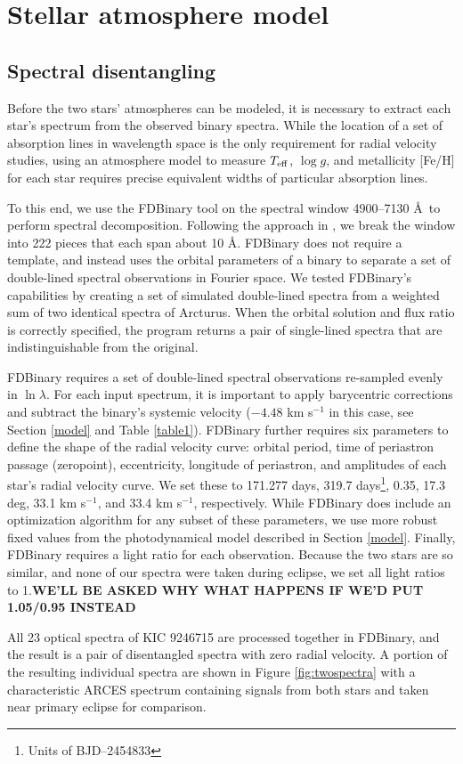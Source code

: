 \section{Stellar atmosphere model}\label{atm}

\subsection{Spectral disentangling}\label{disentangle}
Before the two stars' atmospheres can be modeled, it is necessary to extract each star's spectrum from the observed binary spectra. While the location of a set of absorption lines in wavelength space is the only requirement for radial velocity studies, using an atmosphere model to measure $T_{\rm{eff}}$, $\log g$, and metallicity [Fe/H] for each star requires precise equivalent widths of particular absorption lines.

To this end, we use the FDBinary tool \citep{ili04} on the spectral window 4900--7130 \AA \ to perform spectral decomposition. Following the approach in \citet{bec14}, we break the window into 222 pieces that each span about 10 \AA. FDBinary does not require a template, and instead uses the orbital parameters of a binary to separate a set of double-lined spectral observations in Fourier space. We tested FDBinary's capabilities by creating a set of simulated double-lined spectra from a weighted sum of two identical spectra of Arcturus. When the orbital solution and flux ratio is correctly specified, the program returns a pair of single-lined spectra that are indistinguishable from the original.

FDBinary requires a set of double-lined spectral observations re-sampled evenly in $\ln \lambda$. For each input spectrum, it is important to apply barycentric corrections and subtract the binary's systemic velocity ($-4.48$ km s$^{-1}$ in this case, see Section \ref{model} and Table \ref{table1}). FDBinary further requires six parameters to define the shape of the radial velocity curve: orbital period, time of periastron passage (zeropoint), eccentricity, longitude of periastron, and amplitudes of each star's radial velocity curve. We set these to 171.277 days, 319.7 days\footnote{Units of BJD--2454833}, 0.35, 17.3 deg, 33.1 km s$^{-1}$, and 33.4 km s$^{-1}$, respectively. While FDBinary does include an optimization algorithm for any subset of these parameters, we use more robust fixed values from the photodynamical model described in Section \ref{model}. Finally, FDBinary requires a light ratio for each observation. Because the two stars are so similar, and none of our spectra were taken during eclipse, we set all light ratios to 1.{\bf{WE'LL BE ASKED WHY WHAT HAPPENS IF WE'D PUT 1.05/0.95 INSTEAD}}

All 23 optical spectra of KIC 9246715 are processed together in FDBinary, and the result is a pair of disentangled spectra with zero radial velocity. A portion of the resulting individual spectra are shown in Figure \ref{fig:twospectra} with a characteristic ARCES spectrum containing signals from both stars and taken near primary eclipse for comparison.

  
  